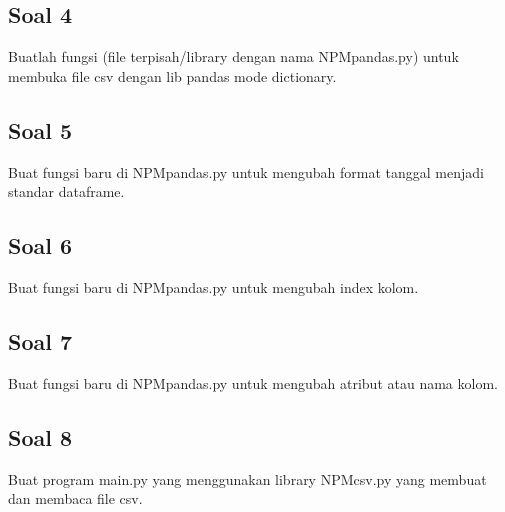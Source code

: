 

\subsection{Soal 4}
Buatlah fungsi (file terpisah/library dengan nama NPMpandas.py) untuk membuka file csv dengan lib pandas mode dictionary.



\subsection{Soal 5}
Buat fungsi baru di NPMpandas.py untuk mengubah format tanggal menjadi standar dataframe.



\subsection{Soal 6}
Buat fungsi baru di NPMpandas.py untuk mengubah index kolom.



\subsection{Soal 7}
Buat fungsi baru di NPMpandas.py untuk mengubah atribut atau nama kolom.



\subsection{Soal 8}
Buat program main.py yang menggunakan library NPMcsv.py yang membuat dan membaca file csv.



